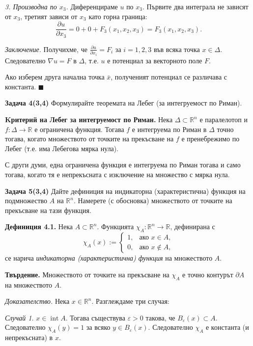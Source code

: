 \documentclass[10pt]{article}
\begin{document}
\textit{3. Производна по $x_3$.} 
Диференцираме $u$ по $x_3$. Първите два интеграла не зависят от $x_3$, третият зависи от $x_3$ като горна граница:
\[
\frac{\partial u}{\partial x_3} = 0 + 0 + F_3(x_1,x_2,x_3) = F_3(x_1,x_2,x_3).
\]

\textit{Заключение.} 
Получихме, че $\frac{\partial u}{\partial x_i} = F_i$ за $i = 1,2,3$ във всяка точка $x \in \Delta$. Следователно $\nabla u = F$ в $\Delta$, т.е. $u$ е потенциал за векторното поле $F$.

Ако изберем друга начална точка $\bar{x}$, полученият потенциал се различава с константа. $\blacksquare$


\textbf{Задача 4(3,4) }Формулирайте теоремата на Лебег (за интегруемост по Риман). 

\textbf{Kритерий на Лебег за интегруемост по Риман.} 
Нека $\Delta \subset \mathbb{R}^n$ е паралелотоп и $f : \Delta \to \mathbb{R}$ е ограничена функция. Тогава $f$ е интегруема по Риман в $\Delta$ точно тогава, когато множеството от точките на прекъсване на $f$ е пренебрежимо по Лебег (т.е. има Лебегова мярка нула).

С други думи, една ограничена функция е интегруема по Риман тогава и само тогава, когато тя е непрекъсната с изключение на множество с мярка нула.


\textbf{Задача 5(3,4) }Дайте дефиниция на индикаторна (характеристична) функция на подмножество $A$ на $\mathbb{R}^n$. Намерете (с обосновка) множеството от точките на прекъсване на тази функция. 

\textbf{Дефиниция 4.1.} 
Нека $A \subset \mathbb{R}^n$. Функцията $\chi_A : \mathbb{R}^n \to \mathbb{R}$, дефинирана с
\[
\chi_A(x) := 
\begin{cases}
1, & \text{ако } x \in A, \\[4pt]
0, & \text{ако } x \notin A,
\end{cases}
\]
се нарича \textit{индикаторна (характеристична) функция} на множеството $A$.

\textbf{Твърдение.} 
Множеството от точките на прекъсване на $\chi_A$ е точно контурът $\partial A$ на множеството $A$.

\textit{Доказателство.} 
Нека $x \in \mathbb{R}^n$. Разглеждаме три случая:

\textit{Случай 1.} $x \in \operatorname{int} A$. 
Тогава съществува $\varepsilon > 0$ такова, че $B_\varepsilon(x) \subset A$. Следователно $\chi_A(y) = 1$ за всяко $y \in B_\varepsilon(x)$. Следователно $\chi_A$ е константа (и непрекъсната) в $x$.
\end{document}
